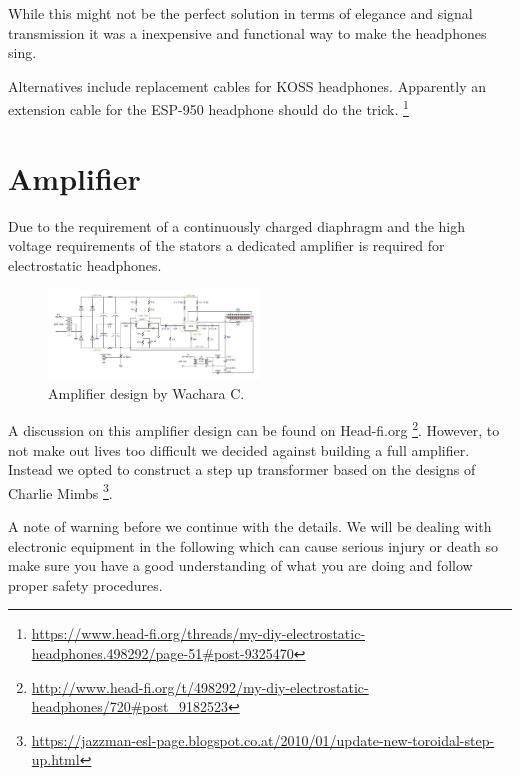 \documentclass{article}
\begin{document}
While this might not be the perfect solution in terms of elegance and signal transmission it was a inexpensive and functional way to make the headphones sing.

Alternatives include replacement cables for KOSS headphones. Apparently an extension cable for the ESP-950 headphone should do the trick. \footnote{\url{https://www.head-fi.org/threads/my-diy-electrostatic-headphones.498292/page-51#post-9325470}}


\section{Amplifier}
\label{s:amp}
Due to the requirement of a continuously charged diaphragm and the high voltage requirements of the stators a dedicated amplifier is required for electrostatic headphones.
\begin{figure}[htb]
    \centering
    \includegraphics[width=0.5\textwidth]{images/wachara-amp.png}
    \caption{Amplifier design by Wachara C.}
    \label{f:amp:wachara}
\end{figure}
A discussion on this amplifier design can be found on Head-fi.org \footnote{\url{http://www.head-fi.org/t/498292/my-diy-electrostatic-headphones/720#post_9182523}}. However, to not make out lives too difficult we decided against building a full amplifier. Instead we opted to construct a step up transformer based on the designs of Charlie Mimbs \footnote{\url{https://jazzman-esl-page.blogspot.co.at/2010/01/update-new-toroidal-step-up.html}}.

A note of warning before we continue with the details. We will be dealing with electronic equipment in the following which can cause serious injury or death so make sure you have a good understanding of what you are doing and follow proper safety procedures.
\end{document}
